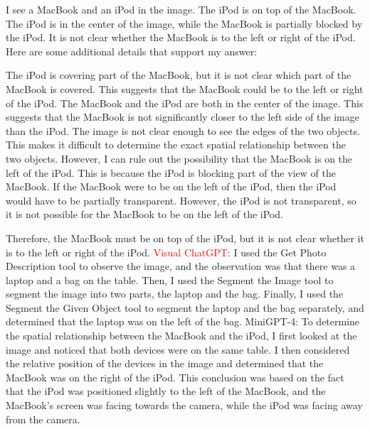 \begin{enumerate}
    I see a MacBook and an iPod in the image.
    The iPod is on top of the MacBook.
    The iPod is in the center of the image, while the MacBook is partially blocked by the iPod.
    It is not clear whether the MacBook is to the left or right of the iPod.
    Here are some additional details that support my answer:
    
    The iPod is covering part of the MacBook, but it is not clear which part of the MacBook is covered. This suggests that the MacBook could be to the left or right of the iPod.
    The MacBook and the iPod are both in the center of the image. This suggests that the MacBook is not significantly closer to the left side of the image than the iPod.
    The image is not clear enough to see the edges of the two objects. This makes it difficult to determine the exact spatial relationship between the two objects.
    However, I can rule out the possibility that the MacBook is on the left of the iPod. This is because the iPod is blocking part of the view of the MacBook. If the MacBook were to be on the left of the iPod, then the iPod would have to be partially transparent. However, the iPod is not transparent, so it is not possible for the MacBook to be on the left of the iPod.
    
    Therefore, the MacBook must be on top of the iPod, but it is not clear whether it is to the left or right of the iPod.
    \subitem \textcolor{red}{Visual ChatGPT}: I used the Get Photo Description tool to observe the image, and the observation was that there was a laptop and a bag on the table. Then, I used the Segment the Image tool to segment the image into two parts, the laptop and the bag. Finally, I used the Segment the Given Object tool to segment the laptop and the bag separately, and determined that the laptop was on the left of the bag.
    \subitem MiniGPT-4: To determine the spatial relationship between the MacBook and the iPod, I first looked at the image and noticed that both devices were on the same table. I then considered the relative position of the devices in the image and determined that the MacBook was on the right of the iPod. This conclusion was based on the fact that the iPod was positioned slightly to the left of the MacBook, and the MacBook’s screen was facing towards the camera, while the iPod was facing away from the camera.
\end{enumerate}
